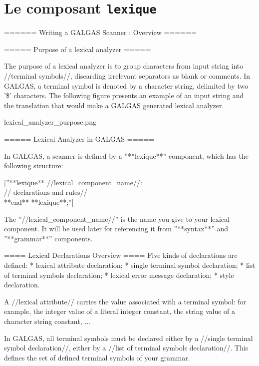 
\chapter{Le composant \texttt{lexique}}



====== Writing a GALGAS Scanner : Overview ======

===== Purpose of a lexical analyzer =====

The purpose of a lexical analyzer is to group characters from input string into //terminal symbols//, discarding irrelevant separators as blank or comments. In GALGAS, a terminal symbol is denoted by a character string, delimited by two '\$' characters. The following figure presents an example of an input string and the translation that would make a GALGAS generated lexical analyzer.

{{ lexical\_analyzer\_purpose.png }}

===== Lexical Analyzer in GALGAS =====

In GALGAS, a scanner is defined by a ''**lexique**'' component, which has the following structure:

|''**lexique** //lexical\_component\_name//:\\ // declarations and rules//\\ **end** **lexique**;''|

The ''//lexical\_component\_name//'' is the name you give to your lexical component. It will be used later for referencing it from ''**syntax**'' and ''**grammar**'' components.

==== Lexical Declarations Overview ====
Five kinds of declarations are defined:
  * lexical attribute declaration;
  * single terminal symbol declaration;
  * list of terminal symbols declaration;
  * lexical error message declaration;
  * style declaration.

A //lexical attribute// carries the value associated with a terminal symbol: for example, the integer value of a literal integer constant, the string value of a character string constant, ...

In GALGAS, all terminal symbols must be declared either by a //single terminal symbol declaration//, either by a //list of terminal symbols declaration//. This defines the set of defined terminal symbols of your grammar.

